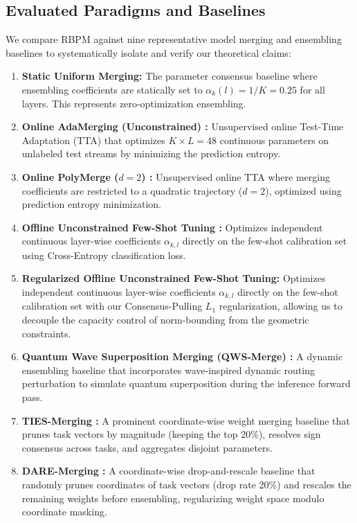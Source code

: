 \subsection{Evaluated Paradigms and Baselines}
We compare RBPM against nine representative model merging and ensembling baselines to systematically isolate and verify our theoretical claims:
\begin{enumerate}
    \item \textbf{Static Uniform Merging:} The parameter consensus baseline where ensembling coefficients are statically set to $\alpha_k(l) = 1/K = 0.25$ for all layers. This represents zero-optimization ensembling.
    \item \textbf{Online AdaMerging (Unconstrained) \cite{yang2023adamerging}:} Unsupervised online Test-Time Adaptation (TTA) that optimizes $K \times L = 48$ continuous parameters on unlabeled test streams by minimizing the prediction entropy.
    \item \textbf{Online PolyMerge ($d = 2$) \cite{polymerge2024}:} Unsupervised online TTA where merging coefficients are restricted to a quadratic trajectory ($d = 2$), optimized using prediction entropy minimization.
    \item \textbf{Offline Unconstrained Few-Shot Tuning \cite{suitemerge2025}:} Optimizes independent continuous layer-wise coefficients $\alpha_{k, l}$ directly on the few-shot calibration set using Cross-Entropy classification loss.
    \item \textbf{Regularized Offline Unconstrained Few-Shot Tuning:} Optimizes independent continuous layer-wise coefficients $\alpha_{k, l}$ directly on the few-shot calibration set with our Consensus-Pulling $L_1$ regularization, allowing us to decouple the capacity control of norm-bounding from the geometric constraints.
    \item \textbf{Quantum Wave Superposition Merging (QWS-Merge) \cite{quantum2025qws}:} A dynamic ensembling baseline that incorporates wave-inspired dynamic routing perturbation to simulate quantum superposition during the inference forward pass.
    \item \textbf{TIES-Merging \cite{yadav2023ties}:} A prominent coordinate-wise weight merging baseline that prunes task vectors by magnitude (keeping the top 20\%), resolves sign consensus across tasks, and aggregates disjoint parameters.
    \item \textbf{DARE-Merging \cite{yu2023dare}:} A coordinate-wise drop-and-rescale baseline that randomly prunes coordinates of task vectors (drop rate 20\%) and rescales the remaining weights before ensembling, regularizing weight space modulo coordinate masking.

\end{enumerate}
